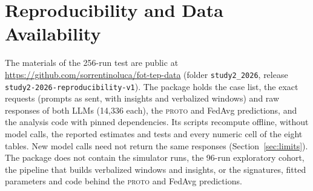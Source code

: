 \documentclass[conference]{IEEEtran}
\newcommand{\PROTO}{\textsc{proto}}
\begin{document}
\section{Reproducibility and Data Availability}
The materials of the 256-run test are public at
\url{https://github.com/sorrentinoluca/fot-tep-data} (folder \texttt{study2\_2026}, release \texttt{study2-2026-reproducibility-v1}). The package holds
the case list, the exact requests (prompts as sent, with insights and
verbalized windows) and raw responses of both LLMs (14,336 each), the
\PROTO{} and FedAvg predictions, and the analysis code with pinned
dependencies. Its scripts recompute offline, without model calls, the reported
estimates and tests and every numeric cell of the eight tables. New model
calls need not return the same responses (Section~\ref{sec:limits}). The
package does not contain the simulator runs, the 96-run exploratory cohort,
the pipeline that builds verbalized windows and insights, or the signatures,
fitted parameters and code behind the \PROTO{} and FedAvg predictions.



\end{document}
